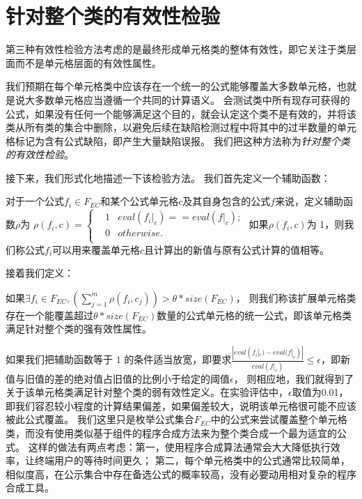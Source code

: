 \section{针对整个类的有效性检验}
第三种有效性检验方法考虑的是最终形成单元格类的整体有效性，即它关注于类层面而不是单元格层面的有效性属性。

我们预期在每个单元格类中应该存在一个统一的公式能够覆盖大多数单元格，也就是说大多数单元格应当遵循一个共同的计算语义。
\wa 会测试类中所有现存可获得的公式，如果没有任何一个能够满足这个目的，\wa 就会认定这个类不是有效的，并将该类从所有类的集合中删除，以避免后续在缺陷检测过程中将其中的过半数量的单元格标记为含有公式缺陷，即产生大量缺陷误报。
我们把这种方法称为\textit{针对整个类的有效性检验}。

接下来，我们形式化地描述一下该检验方法。
我们首先定义一个辅助函数：
\begin{definition}
    对于一个公式$f_i \in F_{EC}$和某个公式单元格$c$及其自身包含的公式$f$来说，定义辅助函数$\rho$为
    $
    \rho(f_i, c) = 
    \left\{
        \begin{aligned}
        & 1     & eval(f_i|_c) == eval(f|_c); \\
        & 0     & otherwise. \\
        \end{aligned}
    \right.
    $
    如果$\rho(f_i,c)$为 1，则我们称公式$f_i$可以用来覆盖单元格$c$且计算出的新值与原有公式计算的值相等。
\end{definition}

接着我们定义：
\begin{definition}
    如果$\exists f_i \in F_{EC}, (\sum_{j = 1}^{m} \rho(f_i, c_j)) > \theta  * size(F_{EC})$，
    则我们称该扩展单元格类存在一个能覆盖超过$\theta  * size(F_{EC})$数量的公式单元格的统一公式，即该单元格类满足针对整个类的强有效性属性。
\end{definition}

如果我们把辅助函数等于 $1$ 的条件适当放宽，即要求$\frac{|eval(f_i|_c)-eval(f|_c)|}{eval(f|_c)} \leq \epsilon$，即新值与旧值的差的绝对值占旧值的比例小于给定的阈值$\epsilon$，
则相应地，我们就得到了关于该单元格类满足针对整个类的弱有效性定义。在实验评估中，$\epsilon$取值为0.01，即我们容忍较小程度的计算结果偏差，如果偏差较大，说明该单元格很可能不应该被此公式覆盖。
我们这里只是枚举公式集合$F_{EC}$中的公式来尝试覆盖整个单元格类，而没有使用类似基于组件的程序合成方法来为整个类合成一个最为适宜的公式。
这样的做法有两点考虑：第一，使用程序合成算法通常会大大降低执行效率，让终端用户的等待时间更久；
第二，每个单元格类中的公式通常比较简单，相似度高，在公示集合中存在备选公式的概率较高，没有必要动用相对复杂的程序合成工具。

